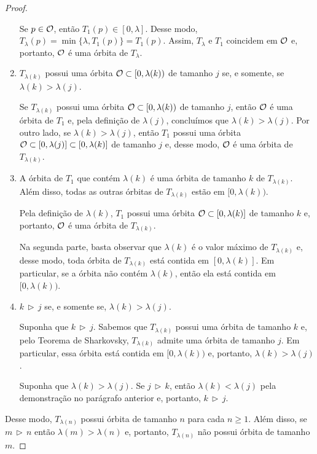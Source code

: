 \begin{proof}
\begin{enumerate}[label=\alph*)]
Se $p \in \mathcal{O}$, então $T_1(p) \in [0, \lambda]$. Desse modo, $T_\lambda(p) = \min \lbrace \lambda, T_1(p) \rbrace = T_1(p)$.
Assim, $T_\lambda$ e $T_1$ coincidem em $\mathcal{O}$ e, portanto, $\mathcal{O}$ é uma órbita de $T_\lambda$.

\item $T_{\lambda(k)}$ possui uma órbita $\mathcal{O} \subset [0, \lambda(k))$ de tamanho $j$ se, e somente, se $\lambda(k) > \lambda(j)$.

Se $T_{\lambda(k)}$ possui uma órbita $\mathcal{O} \subset [0, \lambda(k))$ de tamanho $j$, então $\mathcal{O}$ é uma órbita de $T_1$ e, pela definição de $\lambda(j)$, concluímos que $\lambda(k) > \lambda(j)$.
Por outro lado, se $\lambda(k) > \lambda(j)$, então $T_1$ possui uma órbita $\mathcal{O} \subset [0, \lambda(j)] \subset [0, \lambda(k)]$ de tamanho $j$ e, desse modo, $\mathcal{O}$ é uma órbita de $T_{\lambda(k)}$.

\item A órbita de $T_1$ que contém $\lambda(k)$ é uma órbita de tamanho $k$ de $T_{\lambda(k)}$.
Além disso, todas as outras órbitas de $T_{\lambda(k)}$ estão em $[0, \lambda(k))$. 

Pela definição de $\lambda(k)$, $T_1$ possui uma órbita $\mathcal{O} \subset [0, \lambda(k)]$ de tamanho $k$ e, portanto, $\mathcal{O}$ é uma órbita de $T_{\lambda(k)}$.

Na segunda parte, basta observar que $\lambda(k)$ é o valor máximo de $T_{\lambda(k)}$ e, desse modo, toda órbita de $T_{\lambda(k)}$ está contida em $[0, \lambda(k)]$.
Em particular, se a órbita não contém $\lambda(k)$, então ela está contida em $[0, \lambda(k))$.

\item $k \, \triangleright \, j$ se, e somente se, $\lambda(k) > \lambda(j)$.

Suponha que $k \, \triangleright \, j$. Sabemos que $T_{\lambda(k)}$ possui uma órbita de tamanho $k$ e, pelo Teorema de Sharkovsky, $T_{\lambda(k)}$ admite uma órbita de tamanho $j$. Em particular, essa órbita está contida em $[0, \lambda(k))$ e, portanto, $\lambda(k) > \lambda(j)$.

Suponha que $\lambda(k) > \lambda(j)$. Se $j \, \triangleright \, k$, então $\lambda(k) < \lambda(j)$ pela demonstração no parágrafo anterior e, portanto, $k \, \triangleright \, j$.
\end{enumerate}

Desse modo, $T_{\lambda(n)}$ possui órbita de tamanho $n$ para cada $n \geq 1$. Além disso, se $m \, \triangleright \, n$ então $\lambda(m) > \lambda(n)$ e, portanto, $T_{\lambda(n)}$ não possui órbita de tamanho $m$.
\end{proof}

